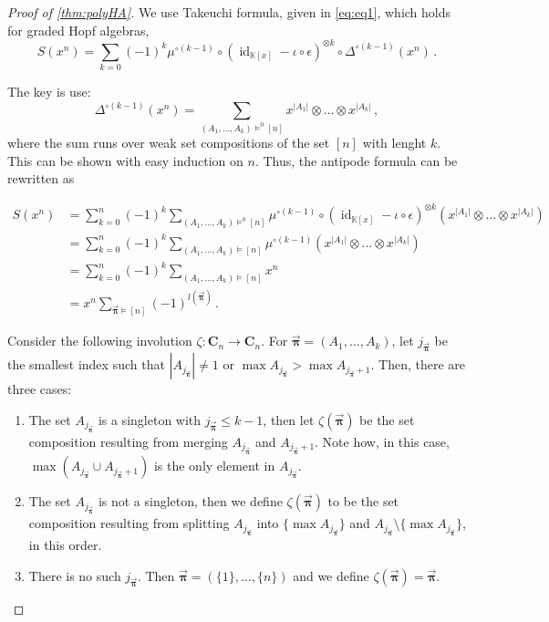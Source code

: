 \documentclass[12pt, reqno]{amsart}
\theoremstyle{definition}
\newcommand{\oPi}{\mathbf{C}}
\newcommand{\opi}{\vec{\boldsymbol{\pi}}}
\DeclareMathOperator{\id}{id}
\begin{document}
\begin{proof}[Proof of \cref{thm:polyHA}]
We use Takeuchi formula, given in \eqref{eq:eq1}, which holds for graded Hopf algebras,
$$S(x^n) = \sum_{k = 0} (-1)^k \mu^{\circ (k-1)} \circ (\id_{\mathbb K[x]} - \iota \circ \epsilon )^{\otimes k} \circ \Delta^{\circ (k-1)} (x^n) \, .$$

The key is use:
$$ \Delta^{\circ (k-1) } (x^n) = \sum_{(A_1, \dots , A_k) \models^0 [n] } x^{|A_1|} \otimes \dots \otimes x^{|A_k|} \, ,$$
where the sum runs over weak set compositions of the set $[n]$ with lenght $k$.
This can be shown with easy induction on $n$.
Thus, the antipode formula can be rewritten as

\begin{align*}
S(x^n)&= \sum_{k=0}^n(-1)^k \sum_{(A_1, \dots , A_k) \models^0 [n]} \mu^{\circ (k-1)} \circ (\id_{\mathbb K[x]} - \iota \circ \epsilon )^{\otimes k} (x^{|A_1|} \otimes \dots \otimes x^{|A_k|})   \\
	  &= \sum_{k=0}^n(-1)^k \sum_{(A_1, \dots , A_k) \models [n]} \mu^{\circ (k-1)} (x^{|A_1|} \otimes \dots \otimes x^{|A_k|})   \\
	  &= \sum_{k=0}^n(-1)^k \sum_{(A_1, \dots , A_k) \models [n]} x^n   \\
	  &= x^n \sum_{\opi \models [n]} (-1)^{l(\opi)}\, .
\end{align*}

Consider the following involution $\zeta: \oPi_{n} \to \oPi_{n} $.
For $\opi = (A_1, \dots , A_k) $, let $j_{\opi}$ be the smallest index such that $|A_{j_{\opi}}| \neq 1$ or $\max A_{j_{\opi}} > \max A_{j_{\opi}+1} $.
Then, there are three cases:

\begin{enumerate}

\item The set $A_{j_{\opi}} $ is a singleton with $j_{\opi}\leq k-1$, then let $\zeta(\opi ) $ be the set composition resulting from merging $A_{j_{\opi}} $ and $A_{j_{\opi}+1}$.
Note how, in this case, $\max ( A_{j_{\opi}} \cup A_{j_{\opi} + 1} ) $ is the only element in $A_{j_{\opi}}$.

\item The set $A_{j_{\opi}} $ is not a singleton, then we define $\zeta(\opi ) $ to be the set composition resulting from splitting $A_{j_{\opi}} $ into $\{ \max A_{j_{\opi}} \} $ and $A_{j_{\opi}} \setminus \{\max A_{j_{\opi}} \}$, in this order.

\item There is no such $j_{\opi}$. Then $\opi = (\{1\}, \dots , \{n\})$ and we define $\zeta(\opi )= \opi $.


\end{enumerate}
\end{proof}
\end{document}
